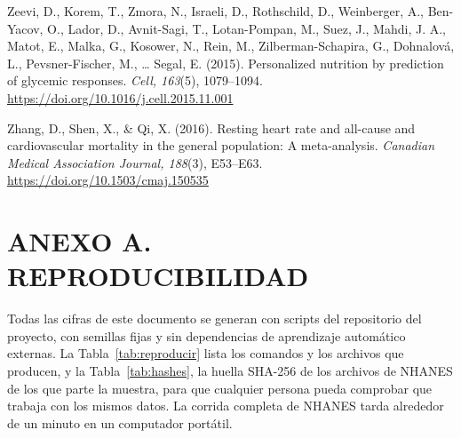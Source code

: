 \documentclass[12pt,letterpaper]{article}
\begin{document}
\begin{enumerate}[label={[\arabic*]}, leftmargin=2.2em]
\item Zeevi, D., Korem, T., Zmora, N., Israeli, D., Rothschild, D., Weinberger,
A., Ben-Yacov, O., Lador, D., Avnit-Sagi, T., Lotan-Pompan, M., Suez, J., Mahdi,
J. A., Matot, E., Malka, G., Kosower, N., Rein, M., Zilberman-Schapira, G.,
Dohnalová, L., Pevsner-Fischer, M., \ldots{} Segal, E. (2015). Personalized
nutrition by prediction of glycemic responses. \textit{Cell, 163}(5),
1079--1094. \url{https://doi.org/10.1016/j.cell.2015.11.001}

\item Zhang, D., Shen, X., \& Qi, X. (2016). Resting heart rate and all-cause and
cardiovascular mortality in the general population: A meta-analysis.
\textit{Canadian Medical Association Journal, 188}(3), E53--E63.
\url{https://doi.org/10.1503/cmaj.150535}

\end{enumerate}

\newpage

\section*{ANEXO A. REPRODUCIBILIDAD}

Todas las cifras de este documento se generan con scripts del repositorio del
proyecto, con semillas fijas y sin dependencias de aprendizaje automático
externas. La Tabla~\ref{tab:reproducir} lista los comandos y los archivos que
producen, y la Tabla~\ref{tab:hashes}, la huella SHA-256 de los archivos de NHANES
de los que parte la muestra, para que cualquier persona pueda comprobar que
trabaja con los mismos datos. La corrida completa de NHANES tarda alrededor de un
minuto en un computador portátil.
\end{document}
